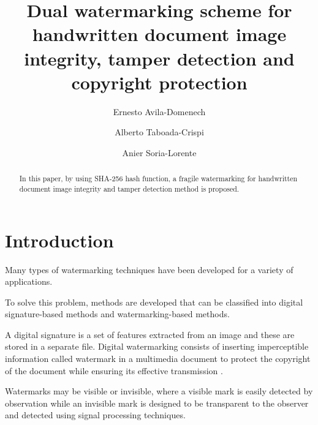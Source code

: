 \documentclass[runningheads]{llncs}
\begin{document}
%
\title{Dual watermarking scheme for handwritten document image integrity, tamper detection and copyright protection}
%
%
\author{Ernesto Avila-Domenech \and
Alberto Taboada-Crispi \and
Anier Soria-Lorente}
%
%
%
\maketitle              %
%
\begin{abstract}
In this paper, by using SHA-256 hash function, a fragile watermarking for handwritten document image integrity and tamper detection method is proposed.

\end{abstract}
%
%
%
\section{Introduction}
Many types of watermarking techniques have been developed for a variety of applications.

To solve this problem, methods are developed that can be classified into digital signature-based methods and watermarking-based methods.

A digital signature is a set of features extracted from an image and these are stored in a separate file. Digital watermarking consists of inserting imperceptible information called watermark in a multimedia document to protect the copyright of the document while ensuring its effective transmission \cite{el2014image}.

Watermarks may be visible or invisible, where a visible mark is easily detected by observation while an invisible mark is designed to be transparent to the observer and detected using signal processing techniques.
\end{document}
